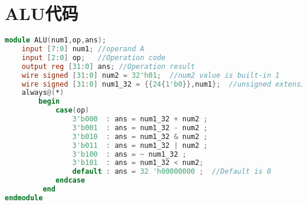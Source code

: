 \newpage
\appendix
\section{ALU代码}
\begin{lstlisting}[language=Verilog]
module ALU(num1,op,ans);
    input [7:0] num1; //operand A
    input [2:0] op;   //Operation code
    output reg [31:0] ans; //Operation result
    wire signed [31:0] num2 = 32'h01;  //num2 value is built-in 1
    wire signed [31:0] num1_32 = {{24{1'b0}},num1};  //unsigned extension to 32-bit operand A
    always@(*)
        begin
            case(op)
                3'b000  : ans = num1_32 + num2 ;
                3'b001  : ans = num1_32 - num2 ;
                3'b010  : ans = num1_32 & num2 ;
                3'b011  : ans = num1_32 | num2 ;
                3'b100  : ans = ~ num1_32 ;
                3'b101  : ans = num1_32 < num2;
                default : ans = 32 'h00000000 ;  //Default is 0
            endcase
         end
endmodule
\end{lstlisting}

